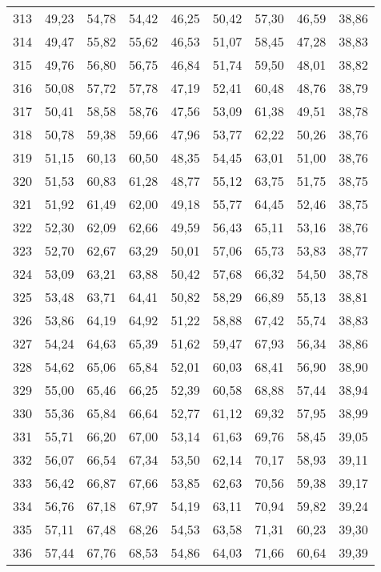 \begin{longtable}{c c c c c c c c c}
313	& 49,23	& 54,78	& 54,42	& 46,25	& 50,42	& 57,30	& 46,59	& 38,86 \\
314	& 49,47	& 55,82	& 55,62	& 46,53	& 51,07	& 58,45	& 47,28	& 38,83 \\
315	& 49,76	& 56,80	& 56,75	& 46,84	& 51,74	& 59,50	& 48,01	& 38,82 \\
316	& 50,08	& 57,72	& 57,78	& 47,19	& 52,41	& 60,48	& 48,76	& 38,79 \\
317	& 50,41	& 58,58	& 58,76	& 47,56	& 53,09	& 61,38	& 49,51	& 38,78 \\
318	& 50,78	& 59,38	& 59,66	& 47,96	& 53,77	& 62,22	& 50,26	& 38,76 \\
319	& 51,15	& 60,13	& 60,50	& 48,35	& 54,45	& 63,01	& 51,00	& 38,76 \\
320	& 51,53	& 60,83	& 61,28	& 48,77	& 55,12	& 63,75	& 51,75	& 38,75 \\
321	& 51,92	& 61,49	& 62,00	& 49,18	& 55,77	& 64,45	& 52,46	& 38,75 \\
322	& 52,30	& 62,09	& 62,66	& 49,59	& 56,43	& 65,11	& 53,16	& 38,76 \\
323	& 52,70	& 62,67	& 63,29	& 50,01	& 57,06	& 65,73	& 53,83	& 38,77 \\
324	& 53,09	& 63,21	& 63,88	& 50,42	& 57,68	& 66,32	& 54,50	& 38,78 \\
325	& 53,48	& 63,71	& 64,41	& 50,82	& 58,29	& 66,89	& 55,13	& 38,81 \\
326	& 53,86	& 64,19	& 64,92	& 51,22	& 58,88	& 67,42	& 55,74	& 38,83 \\
327	& 54,24	& 64,63	& 65,39	& 51,62	& 59,47	& 67,93	& 56,34	& 38,86 \\
328	& 54,62	& 65,06	& 65,84	& 52,01	& 60,03	& 68,41	& 56,90	& 38,90 \\
329	& 55,00	& 65,46	& 66,25	& 52,39	& 60,58	& 68,88	& 57,44	& 38,94 \\
330	& 55,36	& 65,84	& 66,64	& 52,77	& 61,12	& 69,32	& 57,95	& 38,99 \\
331	& 55,71	& 66,20	& 67,00	& 53,14	& 61,63	& 69,76	& 58,45	& 39,05 \\
332	& 56,07	& 66,54	& 67,34	& 53,50	& 62,14	& 70,17	& 58,93	& 39,11 \\
333	& 56,42	& 66,87	& 67,66	& 53,85	& 62,63	& 70,56	& 59,38	& 39,17 \\
334	& 56,76	& 67,18	& 67,97	& 54,19	& 63,11	& 70,94	& 59,82	& 39,24 \\
335	& 57,11	& 67,48	& 68,26	& 54,53	& 63,58	& 71,31	& 60,23	& 39,30 \\
336	& 57,44	& 67,76	& 68,53	& 54,86	& 64,03	& 71,66	& 60,64	& 39,39 \\

\end{longtable}
